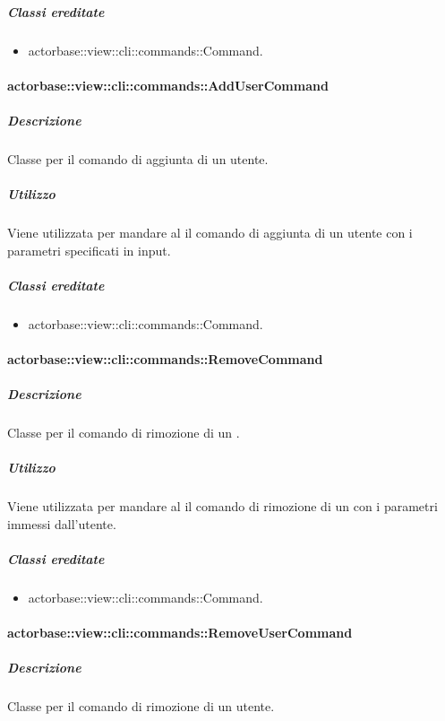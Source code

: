 \documentclass{scalatekids-article}
\begin{document}
\subparagraph{Classi ereditate}

\begin{itemize}
\item actorbase::view::cli::commands::Command.
\end{itemize}

\paragraph{actorbase::view::cli::commands::AddUserCommand}

\subparagraph{Descrizione}

Classe per il comando di aggiunta di un utente.

\subparagraph{Utilizzo}

Viene utilizzata per mandare al  il comando di aggiunta di un utente con i parametri specificati in input.

\subparagraph{Classi ereditate}

\begin{itemize}
\item actorbase::view::cli::commands::Command.
\end{itemize}

\paragraph{actorbase::view::cli::commands::RemoveCommand}

\subparagraph{Descrizione}

Classe per il comando di rimozione di un .

\subparagraph{Utilizzo}

Viene utilizzata per mandare al  il comando di rimozione di un  con i parametri immessi dall'utente.

\subparagraph{Classi ereditate}

\begin{itemize}
\item actorbase::view::cli::commands::Command.
\end{itemize}

\paragraph{actorbase::view::cli::commands::RemoveUserCommand}

\subparagraph{Descrizione}

Classe per il comando di rimozione di un utente.
\end{document}
